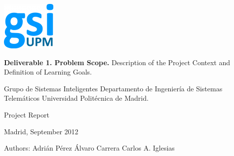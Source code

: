 \begin{titlepage}

\begin{flushright}

\rightskip=-2.5cm

\includegraphics[scale=1]{./img/logoGSI.png} 

\bigskip

\LARGE{\textbf{Deliverable 1. Problem Scope.}}
\linebreak
\large{Description of the Project Context and Definition of Learning Goals.}

\bigskip

\LARGE{Grupo de Sistemas Inteligentes}
\linebreak
\large{Departamento de Ingeniería de Sistemas Telemáticos}
\linebreak
\large{Universidad Politécnica de Madrid.}

\bigskip
\bigskip
\bigskip
\bigskip
\bigskip
\bigskip

\large{Project Report}

\bigskip

\normalsize{Madrid, September 2012}

\bigskip
\bigskip
\bigskip
\bigskip
\bigskip
\bigskip
\bigskip
\bigskip
\bigskip
\bigskip
\bigskip
\bigskip
\bigskip
\bigskip
\bigskip
\bigskip

\normalsize{Authors:}
\linebreak
\large{Adrián Pérez}
\linebreak
\large{Álvaro Carrera}
\linebreak
\large{Carlos A. Iglesias}

\end{flushright}
\end{titlepage}
